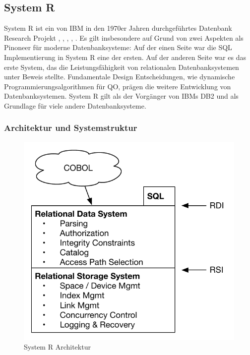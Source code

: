 \subsection{System R}

System R ist ein von IBM in den 1970er Jahren durchgeführtes Datenbank Research Projekt \cite{selinger1979access}, \cite{wade2012ibm}, \cite{chamberlin1981history}, \cite{astrahan1976system}, \cite{astrahan1978system}. Es gilt insbesondere auf Grund von zwei Aspekten als Pinoneer für moderne Datenbanksysteme: Auf der einen Seite war die \ac{SQL} Implementierung in System R eine der ersten. Auf der anderen Seite war es das erste System, das die Leistungsfähigkeit von relationalen Datenbanksystemen unter Beweis stellte. Fundamentale Design Entscheidungen, wie dynamische Programmierungsalgorithmen für \ac{QO}, prägen die weitere Entwicklung von Datenbanksystemen. System R gilt als der Vorgänger von IBMs DB2 und als Grundlage für viele andere Datenbanksysteme.


\subsubsection{Architektur und Systemstruktur}

\begin{figure}[h]
  \centering
  \includegraphics{03_Related_Work/SystemR.pdf}
  \caption{System R Architektur \cite{astrahan1976system} \cite{astrahan1978system}}
  \label{SystemRArchitecture}
\end{figure}


